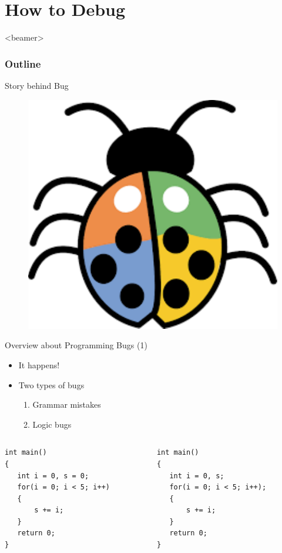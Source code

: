\section{How to Debug}
\label{sec:debug}
\begin{frame}<beamer>
    \frametitle{Outline}
    \tableofcontents[currentsection]
\end{frame}

\begin{frame}{Story behind Bug}
\begin{figure}
	\includegraphics[width=0.4\linewidth]{figs/debug.pdf}
\end{figure}
\end{frame}

\begin{frame}[fragile]{Overview about Programming Bugs (1)}
\begin{itemize}
	\item {It happens!}
	\item {Two types of bugs}
	\begin{enumerate}
		\item {Grammar mistakes}
		\item {Logic bugs}
	\end{enumerate}
\end{itemize}
\vspace{-0.2in}
\begin{columns}
\begin{column}{0.48\linewidth}
\begin{lstlisting}
int main()
{
   int i = 0, s = 0;
   for(i = 0; i < 5; i++)
   {
       s += i;
   }
   return 0;
}
\end{lstlisting}
\end{column}
\begin{column}{0.48\linewidth}
\begin{lstlisting}
int main()
{
   int i = 0, s;
   for(i = 0; i < 5; i++);
   {
       s += i;
   }
   return 0;
}
\end{lstlisting}
\end{column}
\end{columns}
\end{frame}


